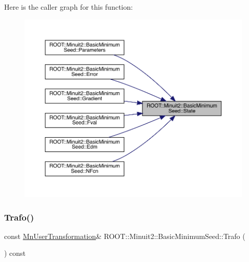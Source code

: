 Here is the caller graph for this function\+:
\nopagebreak
\begin{figure}[H]
\begin{center}
\leavevmode
\includegraphics[width=350pt]{de/d50/classROOT_1_1Minuit2_1_1BasicMinimumSeed_a92e671b9a963d83076238c2e2b283e7c_icgraph}
\end{center}
\end{figure}
\mbox{\label{classROOT_1_1Minuit2_1_1BasicMinimumSeed_aa40157cea0a8a75b56af25bbc64f8d39}} 
\subsubsection{\texorpdfstring{Trafo()}{Trafo()}\hspace{0.1cm}{\footnotesize\ttfamily [1/3]}}
{\footnotesize\ttfamily const \mbox{\hyperlink{classROOT_1_1Minuit2_1_1MnUserTransformation}{Mn\+User\+Transformation}}\& R\+O\+O\+T\+::\+Minuit2\+::\+Basic\+Minimum\+Seed\+::\+Trafo (\begin{DoxyParamCaption}{ }\end{DoxyParamCaption}) const\hspace{0.3cm}{\ttfamily [inline]}}

\mbox{\label{classROOT_1_1Minuit2_1_1BasicMinimumSeed_aa40157cea0a8a75b56af25bbc64f8d39}} 
